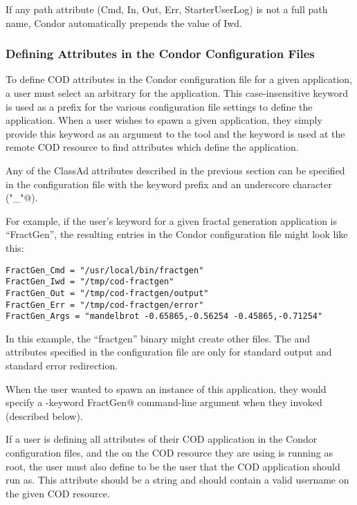 \Note If any path attribute (Cmd, In, Out, Err, StarterUserLog) is not
a full path name, Condor automatically prepends the value of Iwd.


\subsubsection{\label{sec:cod-config-attrs}
Defining Attributes in the Condor Configuration Files}


To define COD attributes in the Condor configuration file for a given
application, a user must select an arbitrary  for
the application.
This case-insensitive keyword is used as a prefix for the various
configuration file settings to define the application.
When a user wishes to spawn a given application, they simply provide
this keyword as an argument to the  tool and the keyword
is used at the remote COD resource to find attributes which define the
application.

Any of the ClassAd attributes described in the previous section can be
specified in the configuration file with the keyword prefix and an
underscore character (\verb@"_"@).

For example, if the user's keyword for a given fractal generation
application is ``FractGen'', the resulting entries in the Condor
configuration file might look like this:

\begin{verbatim}
FractGen_Cmd = "/usr/local/bin/fractgen"
FractGen_Iwd = "/tmp/cod-fractgen"
FractGen_Out = "/tmp/cod-fractgen/output"
FractGen_Err = "/tmp/cod-fractgen/error"
FractGen_Args = "mandelbrot -0.65865,-0.56254 -0.45865,-0.71254"
\end{verbatim}

In this example, the ``fractgen'' binary might create other files.
The  and  attributes specified in the
configuration file are only for standard output and standard error
redirection.

When the user wanted to spawn an instance of this application, they
would specify a \verb@-keyword FractGen@ command-line argument when
they invoked  (described below).

\Note If a user is defining all attributes of their COD application in
the Condor configuration files, and the  on the COD
resource they are using is running as root, the user must also define
 to be the user that the COD application should run as.
This attribute should be a string and should contain a valid username
on the given COD resource.


